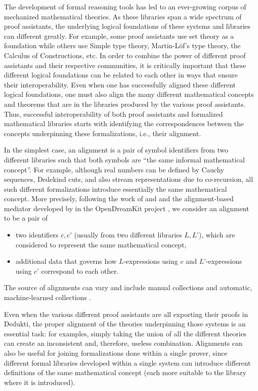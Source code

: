 The development of formal reasoning tools has led to an ever-growing
corpus of mechanized mathematical theories. As these libraries span a
wide spectrum of proof assistants, the underlying logical foundations
of these systems and libraries can different greatly. For example,
some proof assistants use set theory as a foundation while others use
Simple type theory, Martin-L\"of's type theory, the Calculus of
Constructions, etc.  In order to combine the power of different proof
assistants and their respective communities, it is critically
important that these different logical foundations can be related to
each other in ways that ensure their interoperability.  Even when one
has successfully aligned these different logical foundations, one must
also align the many different mathematical concepts and theorems that
are in the libraries produced by the various proof assistants. Thus,
successful interoperability of both proof assistants and formalized
mathematical libraries starts with identifying the correspondences
between the concepts underpinning these formalizations, i.e., their
alignment.

In the simplest case, an alignment is a pair of symbol identifiers
from two different libraries such that both symbols are ``the same
informal mathematical concept''. For example, although real numbers
can be defined by Cauchy sequences, Dedekind cuts, and also stream
representations due to co-recursion, all such different formalizations
introduce essentially the same mathematical concept. More precisely,
following the work of  and 
\cite{GKKMR:alignments:17} and the alignment-based mediator developed
by  in the OpenDreamKit project \cite{ODK:mitm:18}, we
consider an alignment to be a pair of
\begin{itemize}
  \item two identifiers $c,c’$ (usually from two different libraries
    $L,L’$), which are considered to represent the same mathematical
    concept,
  \item additional data that governs how $L$-expressions using $c$ and
    $L’$-expressions using $c’$ correspond to each other.
\end{itemize}
The source of alignments can vary and include manual collections
\cite{MRLR:alignments:17} and automatic, machine-learned collections
\cite{align_kaliszyk}.

Even when the various different proof assistants are all exporting their
proofs in Dedukti, the proper alignment of the theories underpinning
those systems is an essential task: for examples, simply taking the
union of all the different theories can create an inconsistent and,
therefore, useless combination.
%
Alignments can also be useful for joining formalizations done within a
single prover, since different formal libraries developed within a
single system can introduce different definitions of the same
mathematical concept (each more suitable to the library where it is
introduced).

